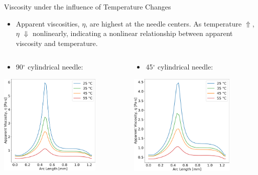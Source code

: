 \begin{frame}{Viscosity under the influence of Temperature Changes}

\footnotesize
\begin{itemize}
    \item Apparent viscosities, $\eta$, are highest at the needle centers. As temperature $\Uparrow$, $\eta$ $\Downarrow$ nonlinearly, indicating a nonlinear relationship between apparent viscosity and temperature.
\end{itemize}
\vspace{-3.5mm}
\begin{columns}
\begin{column}{.333\textwidth}
\begin{itemize}
    \item 90$^{\circ}$ cylindrical needle:
\end{itemize}
\vspace{0.5mm}
\centering
\includegraphics[trim = 0mm 0mm 0mm 0mm, clip, width=1.9in]{./images/90_nudata_sphere.png}
\end{column}

\begin{column}{.333\textwidth}
\begin{itemize}
    \item 45$^{\circ}$ cylindrical needle:
\end{itemize}
\vspace{0.5mm}
\centering
\includegraphics[trim = 0mm 0mm 0mm 0mm, clip, width=1.98in]{./images/45_nudata_sphere.png}
\end{column}


\end{columns}
\end{frame}
